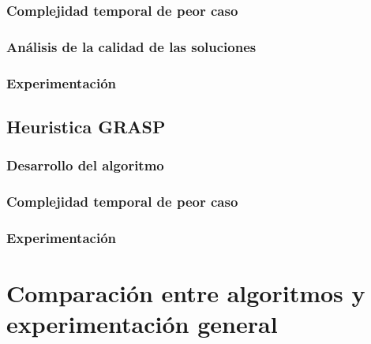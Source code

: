 \documentclass[a4paper, 10pt, twoside]{article}
\begin{document}
      \subsubsection{Complejidad temporal de peor caso}
      \label{subsub:algoritmos-heuristicos-busqueda-complejidad.tex}
      

      \subsubsection{Análisis de la calidad de las soluciones}
      \label{subsub:algoritmos-heuristicos-busqueda-calidad.tex}
      

      \subsubsection{Experimentación}
      \label{subsub:algoritmos-heuristicos-busqueda-experimentacion.tex}
      
  \newpage

  \subsection{Heuristica GRASP}
  \label{sub:algoritmos-heuristicos-grasp}
      \subsubsection{Desarrollo del algoritmo}
      \label{subsub:algoritmos-heuristicos-grasp-desarrollo.tex}
      

      \subsubsection{Complejidad temporal de peor caso}
      \label{subsub:algoritmos-heuristicos-grasp-complejidad.tex}
      

      \subsubsection{Experimentación}
      \label{subsub:algoritmos-heuristicos-grasp-experimentacion.tex}
      

\newpage



\section{Comparación entre algoritmos y experimentación general}
\label{sec:experimentacion-general}


\newpage
\end{document}
